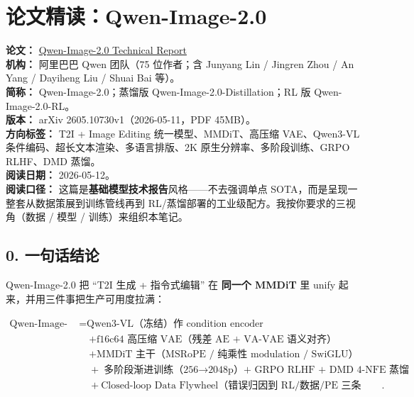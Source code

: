 
\section{论文精读：Qwen-Image-2.0}

\begin{conceptbox}
\textbf{论文：} \href{https://arxiv.org/abs/2605.10730}{Qwen-Image-2.0 Technical Report}\\
\textbf{机构：} 阿里巴巴 Qwen 团队（75 位作者；含 Junyang Lin / Jingren Zhou / An Yang / Dayiheng Liu / Shuai Bai 等）。\\
\textbf{简称：} Qwen-Image-2.0；蒸馏版 Qwen-Image-2.0-Distillation；RL 版 Qwen-Image-2.0-RL。\\
\textbf{版本：} arXiv 2605.10730v1（2026-05-11，PDF 45MB）。\\
\textbf{方向标签：} T2I + Image Editing 统一模型、MMDiT、高压缩 VAE、Qwen3-VL 条件编码、超长文本渲染、多语言排版、2K 原生分辨率、多阶段训练、GRPO RLHF、DMD 蒸馏。\\
\textbf{阅读日期：} 2026-05-12。\\
\textbf{阅读口径：} 这篇是\textbf{基础模型技术报告}风格——不去强调单点 SOTA，而是呈现一整套从数据策展到训练管线再到 RL/蒸馏部署的工业级配方。我按你要求的三视角（数据 / 模型 / 训练）来组织本笔记。
\end{conceptbox}

\subsection{0. 一句话结论}

Qwen-Image-2.0 把 ``T2I 生成 + 指令式编辑'' 在 \textbf{同一个 MMDiT} 里 unify 起来，并用三件事把生产可用度拉满：

\[
\begin{aligned}
\text{Qwen-Image-2.0}
&= \text{Qwen3-VL（冻结）作 condition encoder}\\
&\quad + \text{f16c64 高压缩 VAE（残差 AE + VA-VAE 语义对齐）}\\
&\quad + \text{MMDiT 主干（MSRoPE / 纯乘性 modulation / SwiGLU）}\\
&\quad + \text{多阶段渐进训练（256$\rightarrow$2048p）+ GRPO RLHF + DMD 4-NFE 蒸馏}\\
&\quad + \text{Closed-loop Data Flywheel（错误归因到 RL/数据/PE 三条 track）}.
\end{aligned}
\]

